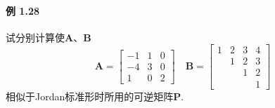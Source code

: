 \documentclass[12pt, a4paper, oneside, fontset=none]{ctexart}
\begin{document}
\paragraph*{例 1.28} 试分别计算使$\bm{A}$、$\bm{B}$
\[
    \bm{A} = \begin{bmatrix}
        -1 & 1 & 0 \\
        -4 & 3 & 0 \\
        1  & 0 & 2
    \end{bmatrix} \quad \bm{B} = \begin{bmatrix}
        1 & 2 & 3 & 4 \\
          & 1 & 2 & 3 \\
          &   & 1 & 2 \\
          &   &   & 1
    \end{bmatrix}
\]
相似于Jordan标准形时所用的可逆矩阵$\bm{P}.$
\end{document}
